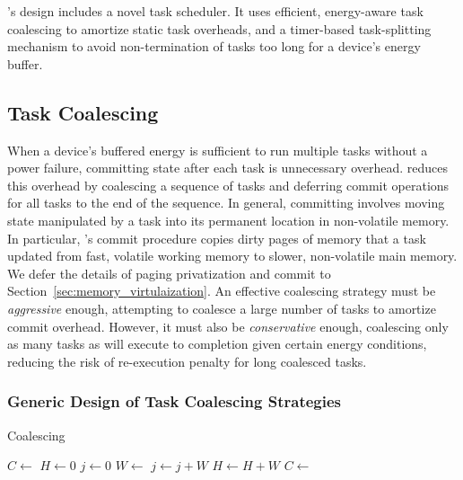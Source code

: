 \sys's design includes a novel task scheduler. It uses efficient, energy-aware task coalescing to amortize static task overheads, and a timer-based task-splitting mechanism to avoid non-termination of tasks too long for a device's energy buffer. 

\subsection{Task Coalescing}
\label{sec:task_coalescing}

When a device's buffered energy is sufficient to run multiple tasks without a power failure, committing state after each task is unnecessary overhead. \sys reduces this overhead by coalescing a sequence of tasks and deferring commit operations for all tasks to the end of the sequence. In general, committing involves moving state manipulated by a task into its permanent location in non-volatile memory. In particular, \sys's commit procedure copies dirty pages of memory that a task updated from fast, volatile working memory to slower, non-volatile main memory. We defer the details of paging privatization and commit to Section~\ref{sec:memory_virtulaization}. An effective coalescing strategy must be {\em aggressive} enough, attempting to coalesce a large number of tasks to amortize commit overhead. However, it must also be  {\em conservative} enough, coalescing only as many tasks as will execute to completion given certain energy conditions, reducing the risk of re-execution penalty for long coalesced tasks.

\subsubsection{Generic Design of Task Coalescing Strategies}
\label{subsec:coalescingGeneral}

\begin{algorithm}[t]
	\caption{Coalescing}
	\label{algo:genCoalescing}
	\small
	\begin{algorithmic}[1]
        \State $C \leftarrow $  
        \State $H \gets 0$ 
	        \State $ j \gets 0$
		        \State {} 
		        \State $W \leftarrow $  
		        \State $j \gets j + W$
				\State $H \gets H + W$
	        \EndWhile
	        \State {}
                \State $C \leftarrow $  
        \EndWhile
	\end{algorithmic}
\end{algorithm}

